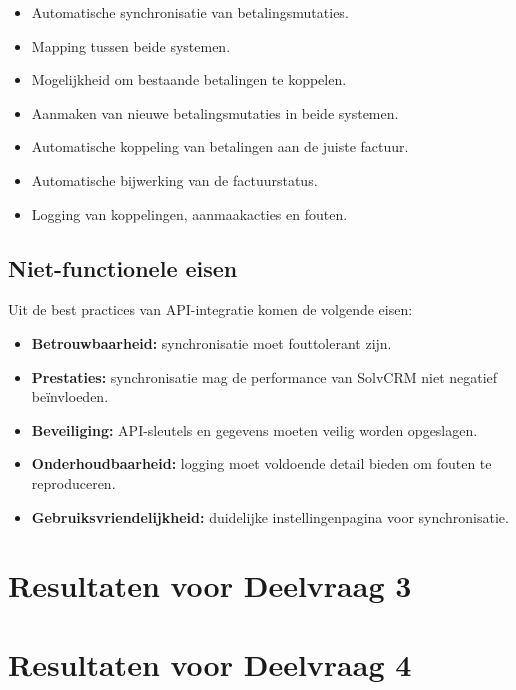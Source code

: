 \begin{itemize}
    \item Automatische synchronisatie van betalingsmutaties.
    \item Mapping tussen beide systemen.
    \item Mogelijkheid om bestaande betalingen te koppelen.
    \item Aanmaken van nieuwe betalingsmutaties in beide systemen.
    \item Automatische koppeling van betalingen aan de juiste factuur.
    \item Automatische bijwerking van de factuurstatus.
    \item Logging van koppelingen, aanmaakacties en fouten.
\end{itemize}

\subsection{Niet-functionele eisen}

Uit de best practices van API-integratie komen de volgende eisen:

\begin{itemize}
    \item \textbf{Betrouwbaarheid:} synchronisatie moet fouttolerant zijn.
    \item \textbf{Prestaties:} synchronisatie mag de performance van SolvCRM niet negatief beïnvloeden.
    \item \textbf{Beveiliging:} API-sleutels en gegevens moeten veilig worden opgeslagen.
    \item \textbf{Onderhoudbaarheid:} logging moet voldoende detail bieden om fouten te reproduceren.
    \item \textbf{Gebruiksvriendelijkheid:} duidelijke instellingenpagina voor synchronisatie.
\end{itemize}

\section{Resultaten voor Deelvraag 3}

\section{Resultaten voor Deelvraag 4}
